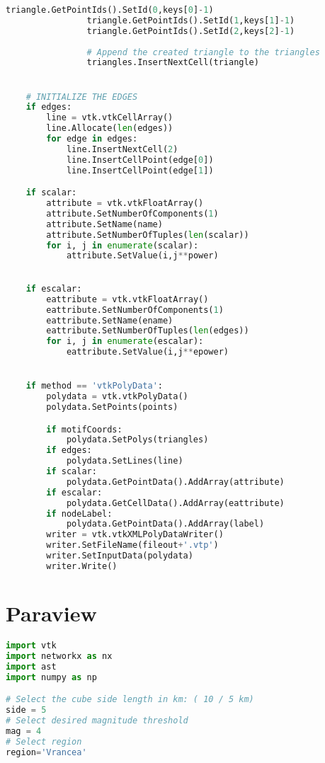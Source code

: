 \documentclass[12pt, twoside]{report}
\begin{document}
\begin{appendices}
\begin{lstlisting}[language=python, frame=single, tabsize=1]
                triangle.GetPointIds().SetId(0,keys[0]-1)
                triangle.GetPointIds().SetId(1,keys[1]-1)
                triangle.GetPointIds().SetId(2,keys[2]-1)
            
                # Append the created triangle to the triangles
                triangles.InsertNextCell(triangle)  


    # INITIALIZE THE EDGES
    if edges:
        line = vtk.vtkCellArray()
        line.Allocate(len(edges))
        for edge in edges:
            line.InsertNextCell(2)
            line.InsertCellPoint(edge[0])
            line.InsertCellPoint(edge[1])   

    if scalar:
        attribute = vtk.vtkFloatArray()
        attribute.SetNumberOfComponents(1)
        attribute.SetName(name)
        attribute.SetNumberOfTuples(len(scalar))
        for i, j in enumerate(scalar): 
            attribute.SetValue(i,j**power)

            
    if escalar:
        eattribute = vtk.vtkFloatArray()
        eattribute.SetNumberOfComponents(1)
        eattribute.SetName(ename)
        eattribute.SetNumberOfTuples(len(edges))
        for i, j in enumerate(escalar): 
            eattribute.SetValue(i,j**epower)


    if method == 'vtkPolyData':
        polydata = vtk.vtkPolyData()
        polydata.SetPoints(points)

        if motifCoords:
            polydata.SetPolys(triangles)
        if edges:
            polydata.SetLines(line)
        if scalar:
            polydata.GetPointData().AddArray(attribute)
        if escalar:
            polydata.GetCellData().AddArray(eattribute)
        if nodeLabel:
            polydata.GetPointData().AddArray(label)
        writer = vtk.vtkXMLPolyDataWriter()
        writer.SetFileName(fileout+'.vtp')
        writer.SetInputData(polydata)
        writer.Write()
\end{lstlisting}


\section{Paraview}
\begin{lstlisting}[language=python, frame=single, tabsize=1] 
import vtk
import networkx as nx
import ast
import numpy as np

# Select the cube side length in km: ( 10 / 5 km)
side = 5
# Select desired magnitude threshold
mag = 4
# Select region
region='Vrancea'


\end{lstlisting}
\end{appendices}
\end{document}
